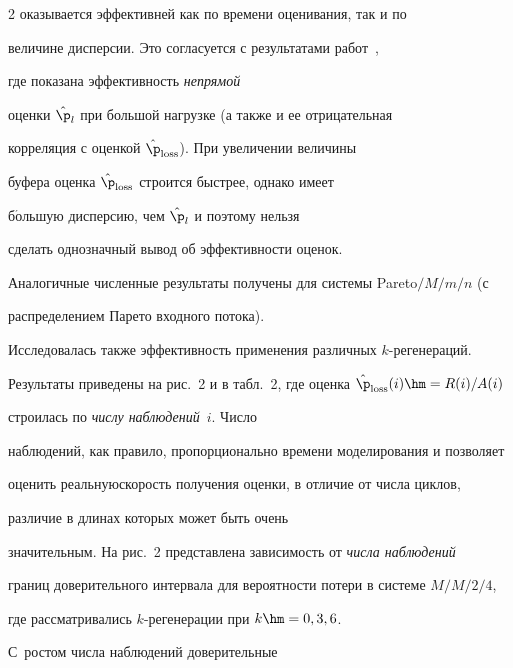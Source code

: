 \begin{multicols}{2}
оказывается эффективней как по времени оценивания, так и по


величине дисперсии.  Это согласуется с результатами работ~\cite{Whitt90, MorNek}, 


где  показана эффективность {\it непрямой}


оценки $\hat{\p}_l$ при большой нагрузке (а также и ее отрицательная


корреляция с оценкой $\hat{\p}_{\mathrm{loss}}$). При увеличении величины


буфера оценка $\hat{\p}_{\mathrm{loss}}$ строится быстрее, однако имеет


б$\acute{\mbox{о}}$льшую дисперсию, чем $\hat{\p}_l$ и поэтому нельзя


сделать однозначный вывод об эффективности оценок.











Аналогичные численные результаты получены  для системы Pareto$/M/m/n$ (с


распределением Парето входного потока).











Исследовалась также эффективность применения различных $k$-ре\-ге\-не\-ра\-ций.


Результаты приведены на  рис.~2 и в табл.~2, где оценка $\hat{\p}_{\mathrm{loss}}(i)\hm=R(i)/A(i)$ 


строилась по {\it числу наблюдений}~$i$. Число


наблюдений, как правило, пропорционально времени моделирования и позволяет


оценить реальную\linebreak скорость получения оценки, в отличие от чис\-ла цик\-лов,


 различие в длинах которых может быть очень


значительным. На рис.~2 представлена зависимость от \textit{числа наблюдений }


границ доверительного интервала  для  вероятности потери в системе $M/M/2/4$,


где  рассматривались $k$-ре\-ге\-не\-ра\-ции при  $k\hm=0,3, 6$. 


С~ростом числа   наблюдений доверительные



\end{multicols}
